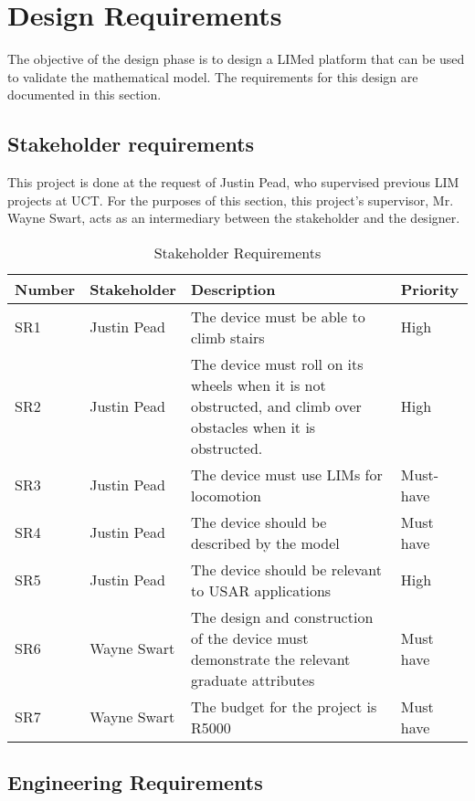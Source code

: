 \chapter{Design Requirements}

The objective of the design phase is to design a LIMed platform that can be used to validate the mathematical model. The requirements for this design are documented in this section.

\section{Stakeholder requirements}

This project is done at the request of Justin Pead, who supervised previous LIM projects at UCT. For the purposes of this section, this project's supervisor, Mr. Wayne Swart, acts as an intermediary between the stakeholder and the designer. 


\begin{table}[h]
	\caption{Stakeholder Requirements}
	\footnotesize
	\begin{tabular}{ | p{3em} | p{6em} | p{23em} | p{5em} |} 
		\hline
		Number& Stakeholder & Description & Priority \\ 
		\hline
		SR1 & Justin Pead & The device must be able to climb stairs & High\\
		\hline
		SR2 & Justin Pead & The device must roll on its wheels when it is not obstructed, and climb over obstacles when it is obstructed. & High\\
		\hline
		SR3 & Justin Pead & The device must use LIMs for locomotion & Must-have\\
		\hline
		SR4 & Justin Pead & The device should be described by the model & Must have\\
		\hline
		SR5 & Justin Pead & The device should be relevant to USAR applications & High\\
		\hline
		SR6 & Wayne Swart & The design and construction of the device must demonstrate the relevant graduate attributes & Must have\\
		\hline
		SR7 & Wayne Swart & The budget for the project is R5000 & Must have\\
		\hline
	\end{tabular}
\end{table}
\newpage

\section{Engineering Requirements}

